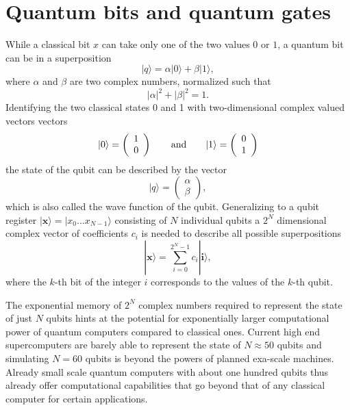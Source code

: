 \documentclass[journal]{IEEEtran}
\begin{document}
\section{Quantum bits and quantum gates}
\label{sec:box1}
While a classical bit $x$ can take only one of the two values $0$ or $1$, a quantum bit can be in a superposition
\begin{equation}
|q\rangle = \alpha |0\rangle +\beta|1\rangle,
\end{equation}
where $\alpha$ and $\beta$ are two complex numbers, normalized such that
\begin{equation}
|\alpha|^2+|\beta|^2=1.
\end{equation}
 Identifying the two classical states 0 and 1 with two-dimensional complex valued vectors vectors 
 \begin{equation}
 |0\rangle = \left(\begin{array}{c}1\\0\end{array}\right) \qquad {\rm and} \qquad  |1\rangle = \left(\begin{array}{c}0\\1\end{array}\right)
 \end{equation}
  the state of the qubit can be described by the vector 
  \begin{equation}
  |q\rangle = \left(\begin{array}{c}\alpha\\\beta\end{array}\right),
  \end{equation} which is also called the wave function of the qubit. Generalizing to a qubit register $| \mathbf{x}\rangle=|x_0\ldots x_{N-1}\rangle$ consisting of $N$ individual qubits a $2^N$ dimensional complex vector of coefficients $c_i$ is needed to describe all possible superpositions
  \begin{equation}
  |\mathbf{x}\rangle = \sum_{i=0}^{2^N-1} c_i |\mathbf{i}\rangle,
  \end{equation}
where the $k$-th bit of the integer $i$ corresponds to the values of the $k$-th qubit.

The exponential memory of $2^N$ complex numbers required to represent the state of just $N$ qubits hints at the potential for exponentially larger computational power of quantum computers compared to classical ones. Current high end supercomputers are barely able to represent the state of $N\approx50$ qubits and simulating $N=60$ qubits is beyond the powers of planned exa-scale machines. Already small scale quantum computers with about one hundred qubits thus already offer computational capabilities that go beyond that of any classical computer for certain applications.
\end{document}
